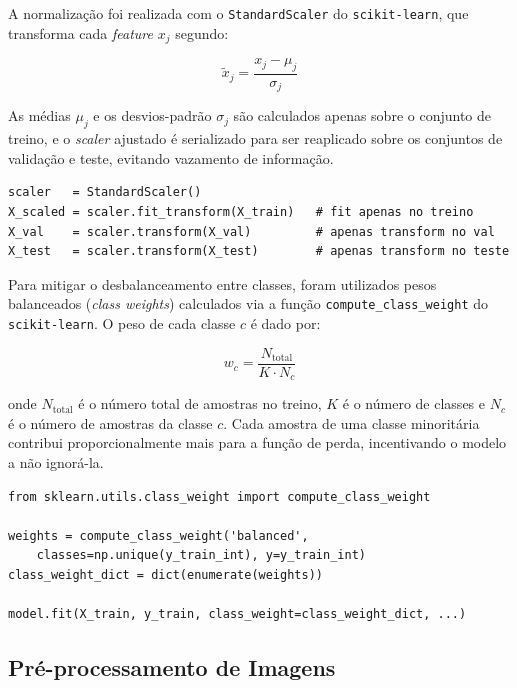 \documentclass[12pt, a4paper]{article}
\begin{document}
A normalização foi realizada com o \texttt{StandardScaler} do
\texttt{scikit-learn}, que transforma cada \textit{feature} $x_j$ segundo:

\begin{equation}
  \tilde{x}_j = \frac{x_j - \mu_j}{\sigma_j}
\end{equation}

As médias $\mu_j$ e os desvios-padrão $\sigma_j$ são calculados apenas
sobre o conjunto de treino, e o \textit{scaler} ajustado é serializado
para ser reaplicado sobre os conjuntos de validação e teste, evitando
vazamento de informação.

\begin{lstlisting}[caption={Escalonamento das \textit{features} tabulares.}, label=lst:scaler]
scaler   = StandardScaler()
X_scaled = scaler.fit_transform(X_train)   # fit apenas no treino
X_val    = scaler.transform(X_val)         # apenas transform no val
X_test   = scaler.transform(X_test)        # apenas transform no teste
\end{lstlisting}

Para mitigar o desbalanceamento entre classes, foram utilizados pesos
balanceados (\textit{class weights}) calculados via a função
\texttt{compute\_class\_weight} do \texttt{scikit-learn}. O peso de cada
classe $c$ é dado por:

\begin{equation}
  w_c = \frac{N_\text{total}}{K \cdot N_c}
\end{equation}

onde $N_\text{total}$ é o número total de amostras no treino, $K$ é o
número de classes e $N_c$ é o número de amostras da classe $c$. Cada
amostra de uma classe minoritária contribui proporcionalmente mais para a
função de perda, incentivando o modelo a não ignorá-la.

\begin{lstlisting}[caption={Cálculo e aplicação dos \textit{class weights}.}, label=lst:classweight]
from sklearn.utils.class_weight import compute_class_weight

weights = compute_class_weight('balanced',
    classes=np.unique(y_train_int), y=y_train_int)
class_weight_dict = dict(enumerate(weights))

model.fit(X_train, y_train, class_weight=class_weight_dict, ...)
\end{lstlisting}

\subsection{Pré-processamento de Imagens}
\end{document}
